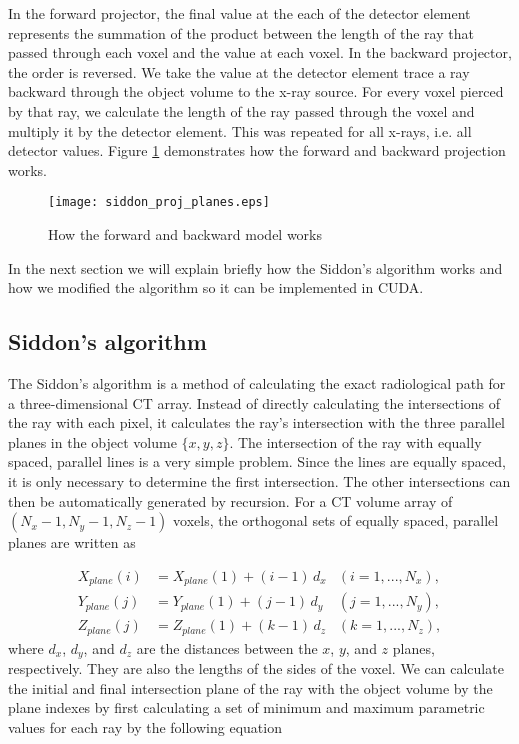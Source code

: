 In the forward projector, the final value at the each of the detector element represents the summation of the product between the length of the ray that passed through each voxel and the value at each voxel.  In the backward projector, the order is reversed. We take the value at the detector element trace a ray backward through the object volume to the x-ray source.  For every voxel pierced by that ray, we calculate the length of the ray passed through the voxel and multiply it by the detector element.  This was repeated for all x-rays, i.e. all detector values.  Figure \ref{fig:forward_backward_model} demonstrates how the forward and backward projection works.

\begin{figure}
\centering
\texttt{[image: siddon\_proj\_planes.eps]}
\caption{How the forward and backward model works}
\label{fig:forward_backward_model}
\end{figure}

In the next section we will explain briefly how the Siddon's algorithm works and how we modified the algorithm so it can be implemented in CUDA. 

\subsection{Siddon's algorithm}
The Siddon's algorithm is a method of calculating the exact radiological path for a three-dimensional CT array.  Instead of directly calculating the intersections of the ray with each pixel, it calculates the ray's intersection with the three parallel planes in the object volume $\{ x, y, z \}$.  The intersection of the ray with equally spaced, parallel lines is a very simple problem.  Since the lines are equally spaced, it is only necessary to determine the first intersection.  The other intersections can then be automatically generated by recursion.  For a CT volume array of $(N_x -1, N_y-1, N_z-1)$ voxels, the orthogonal sets of equally spaced, parallel planes are written as

\begin{equation}
	\begin{aligned}
		X_{plane}(i) & = X_{plane}(1) + (i-1)\, d_x 	&(i = 1, ..., N_x),\\ 
		Y_{plane}(j) & = Y_{plane}(1) + (j-1)\, d_y  	&(j = 1, ..., N_y),\\
		Z_{plane}(j) & = Z_{plane}(1) + (k-1)\, d_z		&(k = 1, ..., N_z),
	\end{aligned}
	\label{eq:siddon_planes}
\end{equation}
where $d_x$, $d_y$, and $d_z$ are the distances between the $x$, $y$, and $z$ planes, respectively.  They are also the lengths of the sides of the voxel.  We can calculate the initial and final intersection plane of the ray with the object volume by the plane indexes by first calculating a set of minimum and maximum parametric values for each ray by the following equation

